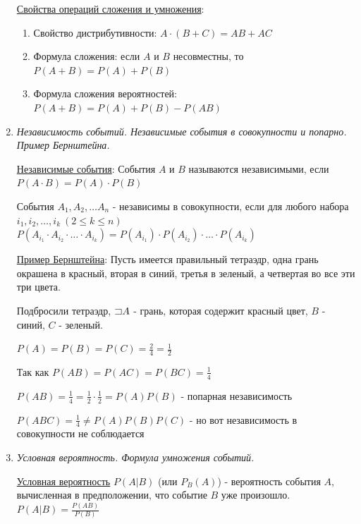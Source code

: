 \documentclass[12pt]{article}
\begin{document}
\begin{enumerate}
    \hyperlink{probabilityoperationsproperties}{Свойства операций сложения и умножения}:

    \begin{enumerate}
        \item Свойство дистрибутивности: $A \cdot (B + C) = AB + AC$

        \item Формула сложения: если $A$ и $B$ несовместны, то $P(A + B) = P(A) + P(B)$

        \item Формула сложения вероятностей: $P(A + B) = P(A) + P(B) - P(AB)$
    \end{enumerate}

    \item \textit{Независимость событий. Независимые события в совокупности и попарно. Пример Бернштейна. }

    \hyperlink{independantevents}{Независимые события}: События $A$ и $B$ называются независимыми, если $P(A \cdot B) = P(A) \cdot P(B)$

    События $A_1, A_2, \dots A_n$ - независимы в совокупности, если для любого набора $i_1, i_2, \dots, i_k \ (2 \leq k \leq n)$
    $P(A_{i_1} \cdot A_{i_2} \cdot \dots \cdot A_{i_k}) = P(A_{i_1}) \cdot P(A_{i_2}) \cdot \dots \cdot P(A_{i_k})$

    \hyperlink{bernshteinsexample}{Пример Бернштейна}: Пусть имеется правильный тетраэдр, одна грань окрашена в красный, вторая в синий, третья в зеленый, а четвертая во все эти три цвета.

    Подбросили тетраэдр, $\mathord{\sqsupset} A$ - грань, которая содержит красный цвет, $B$ - синий, $C$ - зеленый.

    $P(A) = P(B) = P(C) = \frac{2}{4} = \frac{1}{2}$

    Так как $P(AB) = P(AC) = P(BC) = \frac{1}{4}$

    $P(AB) = \frac{1}{4} = \frac{1}{2} \cdot \frac{1}{2} = P(A) P(B)$ - попарная независимость

    $P(ABC) = \frac{1}{4} \neq P(A) P(B) P(C)$ - но вот независимость в совокупности не соблюдается

    \item \textit{Условная вероятность. Формула умножения событий.}

    \hyperlink{conditionalprobability}{Условная вероятность} $P(A|B)$ (или $P_B(A)$) - вероятность события $A$, вычисленная в предположении, что событие $B$ уже произошло. $P(A|B) = \frac{P(AB)}{P(B)}$


\end{enumerate}
\end{document}
